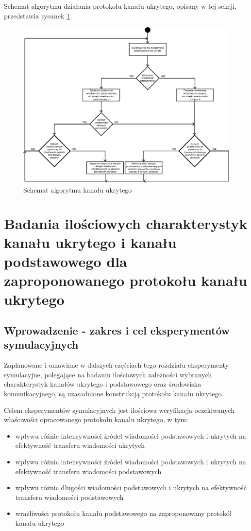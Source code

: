 \documentclass[a4paper, twoside, 12pt]{report}
\begin{document}
    Schemat algorytmu działania protokołu kanału ukrytego, opisany w tej sekcji,
    przedstawia rysunek \ref{CHANNELALGORITHM}.

        \begin{figure}[h]
                \centering
                \includegraphics[scale=0.60, angle=90]{algorytm_kanalu_ukrytego}
                \caption{Schemat algorytmu kanału ukrytego}
                \label{CHANNELALGORITHM}
        \end{figure}

\chapter{Badania ilościowych charakterystyk kanału ukrytego i kanału podstawowego dla zaproponowanego protokołu kanału ukrytego}
    \section{Wprowadzenie - zakres i cel eksperymentów symulacyjnych}
    Zaplanowane i omawiane w dalszych częściach tego rozdziału eksperymenty symulacyjne,
    polegające na badaniu ilościowych zależności wybranych charakterystyk kanałów
    ukrytego i podstawowego oraz środowiska komunikacyjnego, są uzasadnione konstrukcją
    protokołu kanału ukrytego.

    Celem eksperymentów symulacyjnych jest ilościowa weryfikacja oczekiwanych właściwości
    opracowanego protokołu kanału ukrytego, w tym:
    \begin{itemize} \itemsep1pt \parskip0pt 
        \item wpływu różnic intensywności źródeł wiadomości podstawowych i ukrytych na
            efektywność transferu wiadomości ukrytych
        \item wpływu różnic intensywności źródeł wiadomości podstawowych i ukrytych na
            efektywność transferu wiadomości podstawowych
        \item wpływu różnic długości wiadomości podstawowych i ukrytych na efektywność
            transferu wiadomości podstawowych
        \item wrażliwości protokołu kanału podstawowego na zaproponowany protokół
            kanału ukrytego
    \end{itemize}
\end{document}
